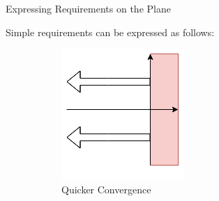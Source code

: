 \documentclass{../templates/topic}
\begin{document}
\begin{section}{Expressing Requirements on the Plane}
	
	Simple requirements can be expressed as follows:
	
	\begin{figure}
		\centering
		
		\begin{subfigure}[b]{0.4\textwidth}
		\includegraphics[width=\textwidth]{assets/complex_plane_convergence.png}
		\caption{Quicker Convergence}
		\end{subfigure}
		\begin{subfigure}[b]{0.4\textwidth}

\end{subfigure}
\end{figure}
\end{section}
\end{document}
